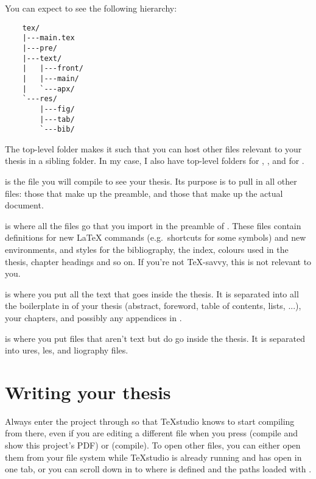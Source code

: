 \newpage

You can expect to see the following hierarchy:

\begin{BVerbatim}
	tex/
	|---main.tex
	|---pre/
	|---text/
	|   |---front/
	|   |---main/
	|   `---apx/
	`---res/
	    |---fig/
	    |---tab/
	    `---bib/
\end{BVerbatim}

The top-level folder  makes it such that you can host other files relevant to your thesis in a sibling folder. In my case, I also have top-level folders for , , and for .

\label{page:maintex-wrong}

 is the file you will compile to see your thesis. Its purpose is to pull in all other  files: those that make up the preamble, and those that make up the actual document.

 is where all the files go that you import in the preamble of . These files contain definitions for new \LaTeX{} commands (e.g.\ shortcuts for some symbols) and new environments, and styles for the bibliography, the index, colours used in the thesis, chapter headings and so on. If you're not \TeX{}-savvy, this is not relevant to you.

 is where you put all the text that goes inside the thesis. It is separated into all the boilerplate in  of your thesis (abstract, foreword, table of contents, lists, ...), your  chapters, and possibly any appendices in .

 is where you put files that aren't text but do go inside the thesis. It is separated into ures, les, and liography files.

\section{Writing your thesis}
Always enter the project through  so that TeXstudio knows to start compiling from there, even if you are editing a different  file when you press  (compile and show this project's PDF) or  (compile). To open other files, you can either open them from your file system while TeXstudio is already running and has  open in one tab, or you can scroll down in  to where \verb|| is defined and  the paths loaded with \verb||.


